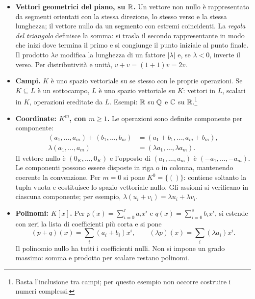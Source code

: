 \begin{itemize}
  \item \textbf{Vettori geometrici del piano, su $\mathbb{R}$.} Un vettore non nullo è rappresentato da segmenti orientati con la stessa direzione, lo stesso verso e la stessa lunghezza; il vettore nullo da un segmento con estremi coincidenti. La \emph{regola del triangolo} definisce la somma: si trasla il secondo rappresentante in modo che inizi dove termina il primo e si congiunge il punto iniziale al punto finale. Il prodotto $\lambda v$ modifica la lunghezza di un fattore $|\lambda|$ e, se $\lambda<0$, inverte il verso. Per distributività e unità, $v+v=(1+1)v=2v$.
\begin{schema}
\end{schema}

  \item \textbf{Campi.} $K$ è uno spazio vettoriale su se stesso con le proprie operazioni. Se $K\subseteq L$ è un sottocampo, $L$ è uno spazio vettoriale su $K$: vettori in $L$, scalari in $K$, operazioni ereditate da $L$. Esempi: $\mathbb{R}$ su $\mathbb{Q}$ e $\mathbb{C}$ su $\mathbb{R}$.\footnote{Basta l'inclusione tra campi; per questo esempio non occorre costruire i numeri complessi.}

  \item \textbf{Coordinate: $K^m$, con $m\ge1$.} Le operazioni sono definite componente per componente:
  \begin{align*}
    (a_1,\ldots,a_m)+(b_1,\ldots,b_m)&=(a_1+b_1,\ldots,a_m+b_m),\\
    \lambda(a_1,\ldots,a_m)&=(\lambda a_1,\ldots,\lambda a_m).
  \end{align*}
  Il vettore nullo è $(0_K,\ldots,0_K)$ e l'opposto di $(a_1,\ldots,a_m)$ è $(-a_1,\ldots,-a_m)$. Le componenti possono essere disposte in riga o in colonna, mantenendo coerente la convenzione. Per $m=0$ si pone $K^0=\{()\}$: contiene soltanto la tupla vuota e costituisce lo spazio vettoriale nullo. Gli assiomi si verificano in ciascuna componente; per esempio, $\lambda(u_i+v_i)=\lambda u_i+\lambda v_i$.

  \item \textbf{Polinomi: $K[x]$.} Per $p(x)=\sum_{i=0}^r a_ix^i$ e $q(x)=\sum_{i=0}^s b_ix^i$, si estende con zeri la lista di coefficienti più corta e si pone
  \[
    (p+q)(x)=\sum_i(a_i+b_i)x^i,\qquad
    (\lambda p)(x)=\sum_i(\lambda a_i)x^i.
  \]
  Il polinomio nullo ha tutti i coefficienti nulli. Non si impone un grado massimo: somma e prodotto per scalare restano polinomi.


\end{itemize}
